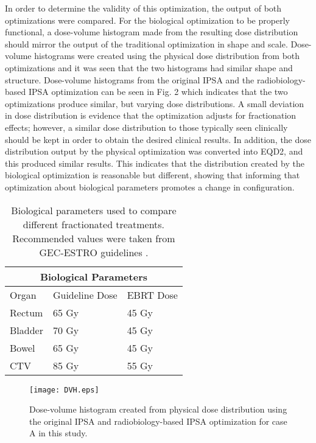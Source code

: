 \documentclass[osajnl,twocolumn,showpacs,superscriptaddress,10pt]{revtex4-1}
\begin{document}
In order to determine the validity of this optimization, the output of both optimizations were compared. For the biological optimization to be properly functional, a dose-volume histogram made from the resulting dose distribution should mirror the output of the traditional optimization in shape and scale. Dose-volume histograms were created using the physical dose distribution from both optimizations and it was seen that the two histograms had similar shape and structure. Dose-volume histograms from the original IPSA and the radiobiology-based IPSA optimization can be seen in Fig. 2 which indicates that the two optimizations produce similar, but varying dose distributions. A small deviation in dose distribution is evidence that the optimization adjusts for fractionation effects; however, a similar dose distribution to those typically seen clinically should be kept in order to obtain the desired clinical results. In addition, the dose distribution output by the physical optimization was converted into EQD2, and this produced similar results. This indicates that the distribution created by the biological optimization is reasonable but different, showing that informing that optimization about biological parameters promotes a change in configuration. 

\begin{table}\label{table}
\setlength{\tabcolsep}{1.75em}
\centering
\vspace{0.25in}
\begin{tabular}{lll}
\hline
\multicolumn{3}{c}{Biological Parameters} \\
\hline
Organ & Guideline Dose & EBRT Dose \\
\hline
Rectum & 65 Gy &    45 Gy\\
Bladder & 70 Gy &    45 Gy\\
Bowel & 65 Gy &    45 Gy\\
CTV & 85 Gy &    55 Gy \\
\hline
\end{tabular}
\caption{Biological parameters used to compare different fractionated treatments. Recommended values were taken from GEC-ESTRO guidelines \cite{GECESTRO}.}
\end{table}

\begin{figure}\label{fig:dvh}
\texttt{[image: DVH.eps]}
\caption{Dose-volume histogram created from physical dose distribution using the original IPSA and radiobiology-based IPSA optimization for case A in this study.}
\end{figure}
\end{document}
